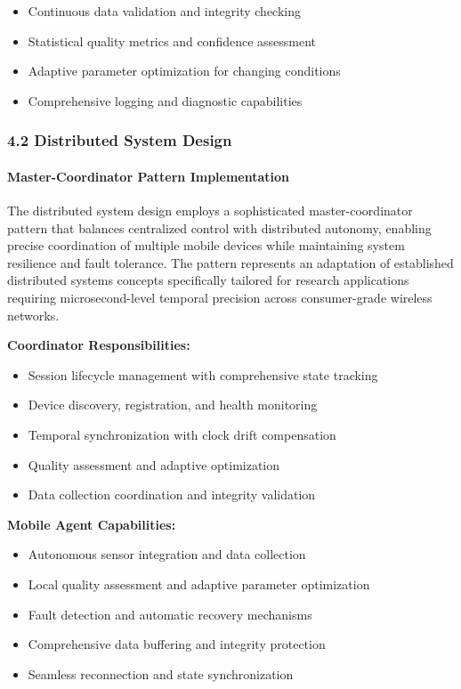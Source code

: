 \documentclass[12pt,a4paper]{report}
\begin{document}
\begin{itemize}
\item Continuous data validation and integrity checking
\item Statistical quality metrics and confidence assessment
\item Adaptive parameter optimization for changing conditions
\item Comprehensive logging and diagnostic capabilities

\end{itemize}
\subsubsection{4.2 Distributed System Design}

\paragraph{Master-Coordinator Pattern Implementation}

The distributed system design employs a sophisticated master-coordinator pattern that balances centralized control with
distributed autonomy, enabling precise coordination of multiple mobile devices while maintaining system resilience and
fault tolerance. The pattern represents an adaptation of established distributed systems concepts specifically tailored
for research applications requiring microsecond-level temporal precision across consumer-grade wireless networks.

\textbf{Coordinator Responsibilities:}

\begin{itemize}
\item Session lifecycle management with comprehensive state tracking
\item Device discovery, registration, and health monitoring
\item Temporal synchronization with clock drift compensation
\item Quality assessment and adaptive optimization
\item Data collection coordination and integrity validation

\end{itemize}
\textbf{Mobile Agent Capabilities:}

\begin{itemize}
\item Autonomous sensor integration and data collection
\item Local quality assessment and adaptive parameter optimization
\item Fault detection and automatic recovery mechanisms
\item Comprehensive data buffering and integrity protection
\item Seamless reconnection and state synchronization

\end{itemize}
\end{document}
